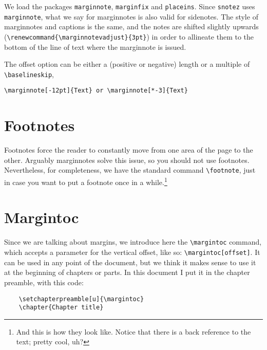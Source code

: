 We load the packages \verb|marginnote|, \verb|marginfix| and 
\verb|placeins|. Since \verb|snotez| uses \verb|marginnote|, what we say 
for marginnotes is also valid for sidenotes. The style of marginnotes 
and captions is the same, and the notes are shifted slightly upwards 
(\verb|\renewcommand{\marginnotevadjust}{3pt}|) in order to allineate 
them to the bottom of the line of text where the marginnote is issued.

The offset option can be either a (positive or negative) length or a 
multiple of \verb|\baselineskip|, \eg
\begin{verbatim}
\marginnote[-12pt]{Text} or \marginnote[*-3]{Text}
\end{verbatim}

\section{Footnotes}

Footnotes force the reader to constantly move from one area of the page 
to the other. Arguably marginnotes solve this issue, so you should not 
use footnotes. Nevertheless, for completeness, we have the standard 
command \verb|\footnote|, just in case you want to put a footnote once 
in a while.\footnote{And this is how they look like. Notice that there 
is a back reference to the text; pretty cool, uh?}

\section{Margintoc}

Since we are talking about margins, we introduce here the 
\verb|\margintoc| command, which accepts a parameter for the vertical 
offset, like so: \verb|\margintoc[offset]|. It can be used in any point 
of the document, but we think it makes sense to use it at the beginning 
of chapters or parts. In this document I put it in the chapter preamble, 
with this code:


\begin{verbatim}
	\setchapterpreamble[u]{\margintoc}
	\chapter{Chapter title}
\end{verbatim}
